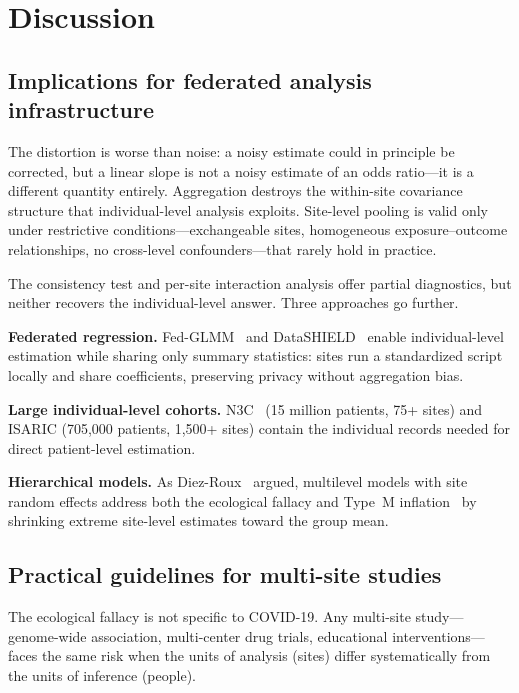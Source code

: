 \documentclass[11pt]{article}
\begin{document}
\section{Discussion}

\subsection{Implications for federated analysis infrastructure}

The distortion is worse than noise: a noisy estimate could in principle
be corrected, but a linear slope is not a noisy estimate of an odds
ratio---it is a different quantity entirely.  Aggregation destroys the
within-site covariance structure that individual-level analysis exploits.
Site-level pooling is valid only under restrictive conditions---exchangeable
sites, homogeneous exposure--outcome relationships, no cross-level
confounders---that rarely hold in practice.

The consistency test and per-site interaction analysis offer partial
diagnostics, but neither recovers the individual-level answer.  Three
approaches go further.

\textbf{Federated regression.}
Fed-GLMM~\cite{yan2023fedglmm} and
DataSHIELD~\cite{banerjee2022dssurvival} enable individual-level estimation
while sharing only summary statistics: sites run a standardized script
locally and share coefficients, preserving privacy without aggregation
bias.

\textbf{Large individual-level cohorts.}  N3C~\cite{haendel2021n3c}
(15 million patients, 75+ sites) and ISARIC (705,000 patients, 1,500+
sites) contain the individual records needed for direct patient-level
estimation.

\textbf{Hierarchical models.}  As
Diez-Roux~\cite{diezroux2000multilevel} argued, multilevel models with
site random effects address both the ecological fallacy and Type~M
inflation~\cite{gelman2012multilevel} by shrinking extreme site-level
estimates toward the group mean.

\subsection{Practical guidelines for multi-site studies}

The ecological fallacy is not specific to COVID-19.  Any multi-site
study---genome-wide association, multi-center drug trials, educational
interventions---faces the same risk when the units of analysis (sites)
differ systematically from the units of inference (people).
\end{document}
